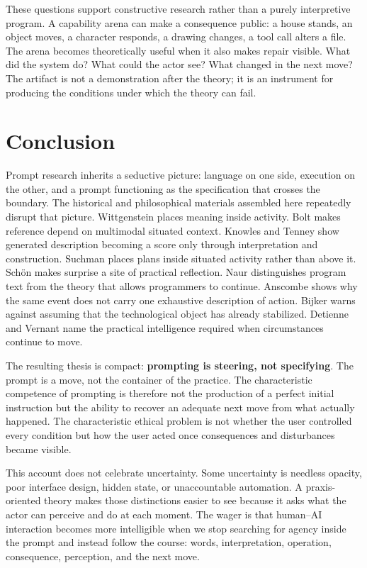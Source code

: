 \documentclass[11pt]{article}
\begin{document}
These questions support constructive research rather than a purely interpretive program. A capability arena can make a consequence public: a house stands, an object moves, a character responds, a drawing changes, a tool call alters a file. The arena becomes theoretically useful when it also makes repair visible. What did the system do? What could the actor see? What changed in the next move? The artifact is not a demonstration after the theory; it is an instrument for producing the conditions under which the theory can fail.

\section{Conclusion}
Prompt research inherits a seductive picture: language on one side, execution on the other, and a prompt functioning as the specification that crosses the boundary. The historical and philosophical materials assembled here repeatedly disrupt that picture. Wittgenstein places meaning inside activity. Bolt makes reference depend on multimodal situated context. Knowles and Tenney show generated description becoming a score only through interpretation and construction. Suchman places plans inside situated activity rather than above it. Sch\"on makes surprise a site of practical reflection. Naur distinguishes program text from the theory that allows programmers to continue. Anscombe shows why the same event does not carry one exhaustive description of action. Bijker warns against assuming that the technological object has already stabilized. Detienne and Vernant name the practical intelligence required when circumstances continue to move.

The resulting thesis is compact: \textbf{prompting is steering, not specifying}. The prompt is a move, not the container of the practice. The characteristic competence of prompting is therefore not the production of a perfect initial instruction but the ability to recover an adequate next move from what actually happened. The characteristic ethical problem is not whether the user controlled every condition but how the user acted once consequences and disturbances became visible.

This account does not celebrate uncertainty. Some uncertainty is needless opacity, poor interface design, hidden state, or unaccountable automation. A praxis-oriented theory makes those distinctions easier to see because it asks what the actor can perceive and do at each moment. The wager is that human--AI interaction becomes more intelligible when we stop searching for agency inside the prompt and instead follow the course: words, interpretation, operation, consequence, perception, and the next move.
\end{document}
